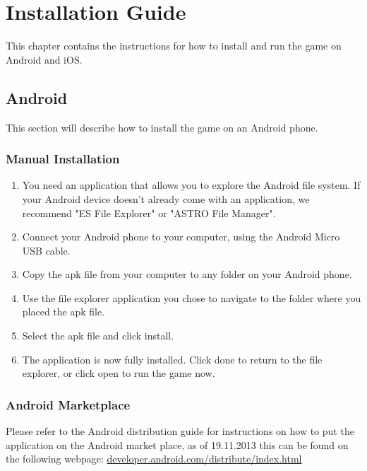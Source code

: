 \chapter{Installation Guide}

This chapter contains the instructions for how to install and run the game on 
Android and iOS.

\clearpage

\section{Android}

This section will describe how to install the game on an Android phone.

\subsection*{Manual Installation}
\begin{enumerate}

	\item{} You need an application that allows you to explore the Android file
	system. If your Android device doesn't already come with an application, 
	we recommend "ES File Explorer" or "ASTRO File Manager".

	\item{} Connect your Android phone to your computer, using the Android Micro
	USB cable.

	\item{} Copy the apk file from your computer to any folder on your Android 
	phone.

	\item{} Use the file explorer application you chose to navigate to the folder 
	where you placed the apk file.

	\item{} Select the apk file and click install.

	\item{} The application is now fully installed. Click done to return to the 
	file explorer, or click open to run the game now.

\end{enumerate}

\subsection*{Android Marketplace}
Please refer to the Android distribution guide for instructions on how to put 
the application on the Android market place, as of 19.11.2013 this can be found 
on the following webpage: \href{http://developer.android.com/distribute/index.html}{developer.android.com/distribute/index.html}

